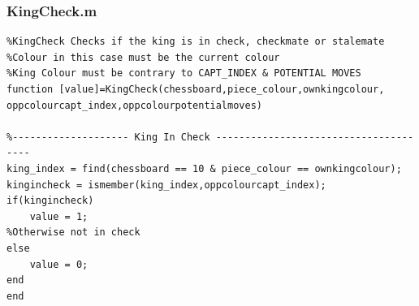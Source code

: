 \documentclass[11pt,a4paper]{article}
\begin{document}
\subsubsection{KingCheck.m}
\begin{lstlisting}
%KingCheck Checks if the king is in check, checkmate or stalemate
%Colour in this case must be the current colour
%King Colour must be contrary to CAPT_INDEX & POTENTIAL MOVES
function [value]=KingCheck(chessboard,piece_colour,ownkingcolour, oppcolourcapt_index,oppcolourpotentialmoves)

%-------------------- King In Check --------------------------------------
king_index = find(chessboard == 10 & piece_colour == ownkingcolour);
kingincheck = ismember(king_index,oppcolourcapt_index);
if(kingincheck)
    value = 1;
%Otherwise not in check
else
    value = 0;
end
end

\end{lstlisting}
\end{document}
